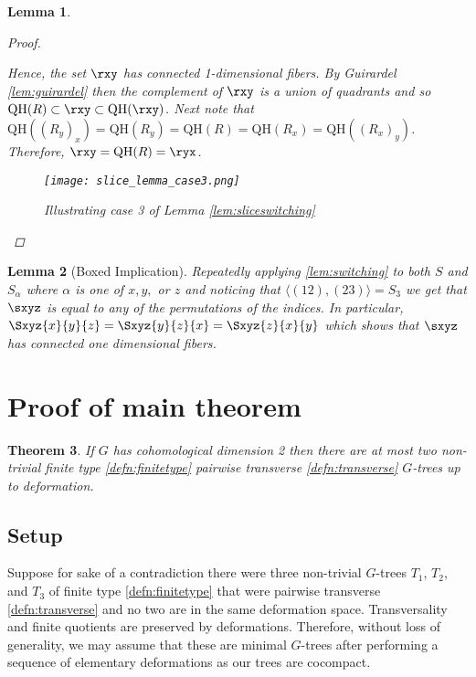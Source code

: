 \documentclass[12pt,parskip=full]{report}
\theoremstyle{plain}
\newtheorem{thm}{Theorem}[section]
\newtheorem{lem}[thm]{Lemma}
\theoremstyle{definition}
\begin{document}
\begin{lem}
\begin{proof}
\begin{enumerate}
        \end{enumerate}
        Hence, the set $\rxy$ has connected 1-dimensional fibers. By Guirardel \ref{lem:guirardel} then the complement of $\rxy$ is a union of quadrants and so $\text{QH}(R)\subset \rxy\subset \text{QH}(\rxy)$. Next note that $\text{QH}((R_y)_x)=\text{QH}(R_y)=\text{QH}(R)=\text{QH}(R_x)=\text{QH}((R_x)_y)$. Therefore, $\rxy =\text{QH}(R)=\ryx$.
        
        
        
        \begin{figure}[htp]
    \centering
    \texttt{[image: slice\_lemma\_case3.png]}
    \caption{Illustrating case 3 of Lemma \ref{lem:sliceswitching}}
    \label{fig:square}
\end{figure}
        
        
        
                  
    \end{proof}
\end{lem}

        \begin{lem}
    [Boxed Implication]
 \label{lem:boximp} 
    Repeatedly applying \ref{lem:switching} to both \(S\) and \(S_{\alpha}\) where \(\alpha\) is one of \(x,y,\) or \(z\)  and noticing that \(\langle (12),(23) \rangle = S_{3}\) we get that \(\sxyz\) is equal to any of the permutations of the indices. In particular, \(\Sxyz{x}{y}{z}=\Sxyz{y}{z}{x}=\Sxyz{z}{x}{y}\) which shows that \(\sxyz\) has connected one dimensional fibers.
\end{lem}

\section{Proof of main theorem}

\begin{thm}
    \label{thm:mainresult}
    If \(G\) has cohomological dimension 2 then there are at most two non-trivial finite type \ref{defn:finitetype} pairwise transverse \ref{defn:transverse} \(G\)-trees up to deformation.
\end{thm}

\subsection{Setup}

Suppose for sake of a contradiction there were three non-trivial \(G\)-trees \(T_{1}\), \(T_{2}\), and \(T_{3}\) of finite type \ref{defn:finitetype} that were pairwise transverse \ref{defn:transverse} and no two are in the same deformation space. Transversality and finite quotients are preserved by deformations. Therefore, without loss of generality, we may assume that these are minimal \(G\)-trees after performing a sequence of elementary deformations as our trees are cocompact. 
\end{document}
